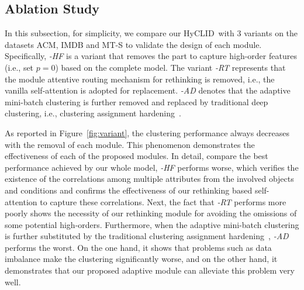 \documentclass[11pt]{article}
\def\modelname{HyCLID}
\begin{document}
\subsection{Ablation Study}
In this subsection, for simplicity, we compare our \modelname~with 3 variants on the datasets ACM, IMDB and MT-S to validate the design of each module.  Specifically, \textit{-HF} is a variant that removes the part to capture high-order features (i.e., set $p=0$) based on the complete model. The variant \textit{-RT} represents that the module attentive routing mechanism for rethinking is removed, i.e., the vanilla self-attention is adopted for replacement. \textit{-AD} denotes that the adaptive mini-batch clustering is further removed and replaced by traditional deep clustering, i.e., clustering assignment hardening~\cite{xie_unsupervised_2016}.


As reported in Figure~\ref{fig:variant}, the clustering performance always decreases with the removal of each module. This phenomenon demonstrates the effectiveness of each of the proposed modules.
In detail, compare the best performance achieved by our whole model, \textit{-HF} performs worse, which verifies the existence of the correlations among multiple attributes from the involved objects and conditions and confirms the effectiveness of our rethinking based self-attention to capture these correlations. Next, the fact that \textit{-RT} performs more poorly shows the necessity of our rethinking module for avoiding the omissions of some potential high-orders. Furthermore, when the adaptive mini-batch clustering is further substituted by the traditional clustering assignment hardening~\cite{xie_unsupervised_2016}, \textit{-AD} performs the worst. On the one hand, it shows that problems such as data imbalance make the clustering significantly worse, and on the other hand, it demonstrates that our proposed adaptive module can alleviate this problem very well.


\end{document}

